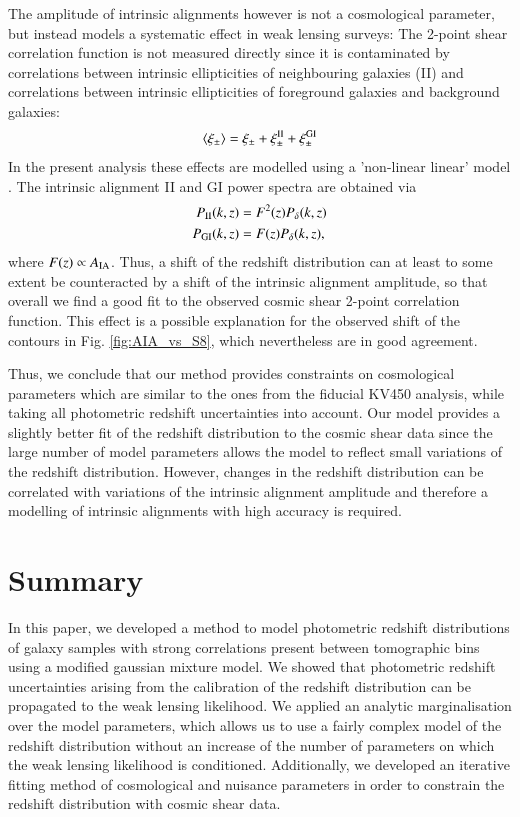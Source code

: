 \documentclass{aa}
\newcommand{\eq}[1]{\begin{equation}  #1 \end{equation}}
\newcommand{\eqa}[1]{\begin{align}   #1 \end{align}}
\begin{document}
The amplitude of intrinsic alignments however is not a cosmological parameter, but instead models a systematic effect in weak lensing surveys:
The 2-point shear correlation function is not measured directly since it is contaminated by correlations between intrinsic ellipticities of neighbouring galaxies (II) and correlations between intrinsic ellipticities of foreground galaxies and background galaxies:
\eq{
\left\langle \xi_\pm \right\rangle = \xi_\pm + \xi_\pm^{\rm II} + \xi_\pm^{\rm GI}
}
In the present analysis these effects are modelled using a 'non-linear linear' model \citep{hirata04,bridle07,joachimi11}. The intrinsic alignment II and GI power spectra are obtained via
\eqa{
P_{\rm II}(k,z) &= F^2(z) P_\delta(k,z)\\
P_{\rm GI}(k,z) &= F(z) P_\delta(k,z),
}
where $F(z)\propto A_{\rm IA}$. Thus, a shift of the redshift distribution can at least to some extent be counteracted by a shift of the intrinsic alignment amplitude, so that overall we find a good fit to the observed cosmic shear 2-point correlation function. This effect is a possible explanation for the observed shift of the contours in Fig. \ref{fig:AIA_vs_S8}, which nevertheless are in good agreement.

Thus, we conclude that our method provides constraints on cosmological parameters which are similar to the ones from the fiducial KV450 analysis, while taking all photometric redshift uncertainties into account. Our model provides a slightly better fit of the redshift distribution to the cosmic shear data since the large number of model parameters allows the model to reflect small variations of the redshift distribution. However, changes in the redshift distribution can be correlated with variations of the intrinsic alignment amplitude and therefore a modelling of intrinsic alignments with high accuracy is required.  
\section{Summary}
\label{sec:discussion}
In this paper, we developed a method to model photometric redshift distributions of galaxy samples with strong correlations  present between tomographic bins using a modified gaussian mixture model. We showed that photometric redshift uncertainties arising from the calibration of the redshift distribution can be propagated to the weak lensing likelihood. We applied an analytic marginalisation over the model parameters, which allows us to use a fairly complex model of the redshift distribution without an increase of the number of parameters on which the weak lensing likelihood is conditioned. Additionally, we developed an iterative fitting method of cosmological and nuisance parameters in order to constrain the redshift distribution with cosmic shear data.
\end{document}
